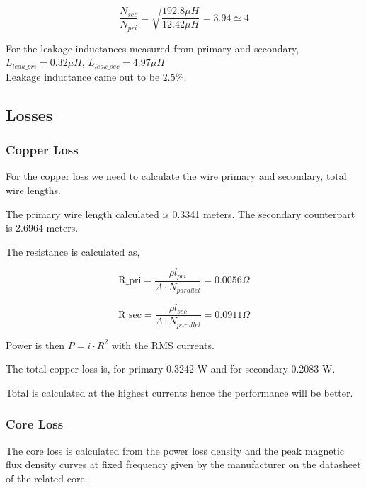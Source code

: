 \documentclass[12pt]{article}
\begin{document}
    \begin{equation*}
        \frac{N_{sec}}{N_{pri}} = \sqrt{\frac{192.8\mu H}{12.42 \mu H}} = 3.94 \simeq 4
    \end{equation*}

    For the leakage inductances measured from primary and secondary,\\
    $L_{leak\_pri} = 0.32\mu H$, $L_{leak\_sec} = 4.97 \mu H$ \\

    Leakage inductance came out to be $2.5\%$.

    

    

    \subsection{Losses}   
    \subsubsection{Copper Loss}
    For the copper loss we need to calculate the wire primary and secondary, total wire lengths.

    The primary wire length calculated is 0.3341 meters. The secondary counterpart is 2.6964 meters.

    The resistance is calculated as,

    \begin{equation*}
        \textrm{R\_pri} = \frac{\rho l_{pri}}{A\cdot N_{parallel}} = 0.0056 \Omega
    \end{equation*}    

    \begin{equation*}
        \textrm{R\_sec} = \frac{\rho l_{sec}}{A\cdot N_{parallel}} = 0.0911 \Omega
    \end{equation*}    

    Power is then $P = i\cdot R^2$ with the RMS currents.

    The total copper loss is, for primary 0.3242 W and for secondary 0.2083 W.

    Total is calculated at the highest currents hence the performance will be better.

    \subsubsection{Core Loss}

    The core loss is calculated from the power loss density and the peak magnetic flux density curves at fixed frequency given by the manufacturer on the datasheet of the related core.
\end{document}
